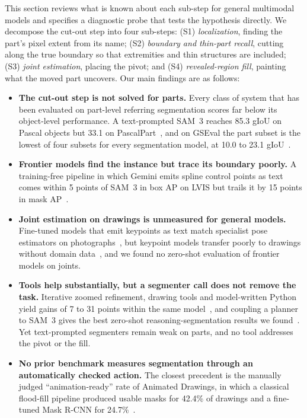 This section reviews what is known about each sub-step for general multimodal models and specifies a diagnostic probe that tests the hypothesis directly. We decompose the cut-out step into four sub-steps: (S1) \emph{localization}, finding the part's pixel extent from its name; (S2) \emph{boundary and thin-part recall}, cutting along the true boundary so that extremities and thin structures are included; (S3) \emph{joint estimation}, placing the pivot; and (S4) \emph{revealed-region fill}, painting what the moved part uncovers. Our main findings are as follows:
\begin{itemize}
\item \textbf{The cut-out step is not solved for parts.} Every class of system that has been evaluated on part-level referring segmentation scores far below its object-level performance. A text-prompted SAM~3 reaches 85.3 gIoU on Pascal objects but 33.1 on PascalPart~\citep{mehrab2026ophrg}, and on GSEval the part subset is the lowest of four subsets for every segmentation model, at 10.0 to 23.1 gIoU~\citep{hu2025groundingsuite}.
\item \textbf{Frontier models find the instance but trace its boundary poorly.} A training-free pipeline in which Gemini emits spline control points as text comes within 5 points of SAM~3 in box AP on LVIS but trails it by 15 points in mask AP~\citep{hamdi2026llmseg}.
\item \textbf{Joint estimation on drawings is unmeasured for general models.} Fine-tuned models that emit keypoints as text match specialist pose estimators on photographs~\citep{wang2024locllm,zhang2025posellm}, but keypoint models transfer poorly to drawings without domain data~\citep{smith2023animateddrawings,chen2022illustratedpose}, and we found no zero-shot evaluation of frontier models on joints.
\item \textbf{Tools help substantially, but a segmenter call does not remove the task.} Iterative zoomed refinement, drawing tools and model-written Python yield gains of 7 to 31 points within the same model~\citep{hamdi2026llmseg,hu2024sketchpad,zhao2025pyvision}, and coupling a planner to SAM~3 gives the best zero-shot reasoning-segmentation results we found~\citep{carion2025sam3}. Yet text-prompted segmenters remain weak on parts, and no tool addresses the pivot or the fill.
\item \textbf{No prior benchmark measures segmentation through an automatically checked action.} The closest precedent is the manually judged ``animation-ready'' rate of Animated Drawings, in which a classical flood-fill pipeline produced usable masks for 42.4\% of drawings and a fine-tuned Mask R-CNN for 24.7\%~\citep{smith2023animateddrawings}.
\end{itemize}

